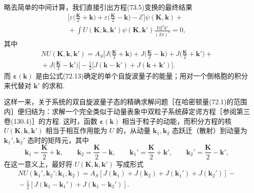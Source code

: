 略去简单的中间计算，我们直接引出方程(73.5)变换的最终结果
\begin{equation}
\begin{aligned}
\biggl[\varepsilon\biggl(\frac{\bm{K}}{2}+\bm{k}\biggr)
+\varepsilon\biggl(\frac{\bm{K}}{2}-\bm{k}\biggr)-\mathcal{E}\biggr]\psi(\bm{K},\bm{k})+{}\\
{}+\int U(\bm{K},\bm{k},\bm{k}')\psi(\bm{K},\bm{k}')
\frac{V\mathrm{d}^3k'}{(2\pi)^3}=0,
\end{aligned}
\end{equation}
其中
\begin{equation}
\begin{aligned}
NU(\bm{K},\bm{k},\bm{k}')=A_S\biggl[J\biggl(\frac{\bm{K}}{2}+\bm{k}\biggr)
+J\biggl(\frac{\bm{K}}{2}-\bm{k}\biggr)
+J\biggl(\frac{\bm{K}}{2}+\bm{k}'\biggr)+{}\\
{}+J\biggl(\frac{\bm{K}}{2}-\bm{k}'\biggr)\biggr]
-\frac{1}{2}\bigl[J(\bm{k}-\bm{k}')+J(\bm{k}+\bm{k}')\bigr].
\end{aligned}
\end{equation}
而 $\bm{\varepsilon}(\bm{k})$ 是由公式(72.13)确定的单个自旋波量子的能量；用对一个倒格胞的积分来代替对 $\bm{k}'$ 的求和.

这样一来，关于系统的双自旋波量子态的精确求解问题［在哈密顿量(72.1)的范围内］便归结为：求解一个完全类似于动量表象中双粒子系统薛定谔方程［参阅第三卷(130.4)］的方程. 这时，函数 $\bm{\varepsilon}(\bm{k})$ 相当于粒子的动能，而积分方程的核 $U(\bm{K},\bm{k},\bm{k}')$ 相当于相互作用能为 $U$ 的，从动量 $\bm{k}_1,\bm{k}_2$ 态跃迁（散射）到动量为 $\bm{k}_1',\bm{k}_2'$ 态时的矩阵元，其中
\begin{equation*}
\bm{k}_1=\frac{\bm{K}}{2}+\bm{k},\qquad
\bm{k}_2=\frac{\bm{K}}{2}-\bm{k},\qquad
\bm{k}_1'=\frac{\bm{K}}{2}+\bm{k}',\qquad
\bm{k}_2'=\frac{\bm{K}}{2}-\bm{k}',
\end{equation*}
在这一意义上，最好将 $U(\bm{K},\bm{k},\bm{k}')$ 写成形式
\begin{equation}
\begin{aligned}
NU(\bm{k}_1',\bm{k}_2';\bm{k}_1,\bm{k}_2)
=A_S[J(\bm{k}_1)+J(\bm{k}_2)+J(\bm{k}_1')+J(\bm{k}_2')]-{}\\
{}-\frac{1}{2}[J(\bm{k}_1-\bm{k}_1')+J(\bm{k}_1-\bm{k}_2')].
\end{aligned}
\end{equation}

